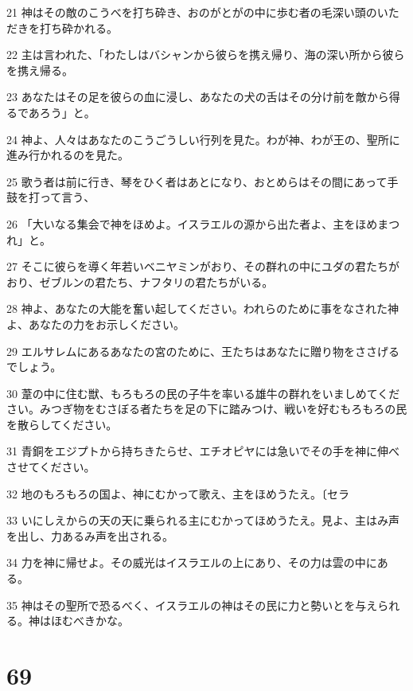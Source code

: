 \par 21 神はその敵のこうべを打ち砕き、おのがとがの中に歩む者の毛深い頭のいただきを打ち砕かれる。
\par 22 主は言われた、「わたしはバシャンから彼らを携え帰り、海の深い所から彼らを携え帰る。
\par 23 あなたはその足を彼らの血に浸し、あなたの犬の舌はその分け前を敵から得るであろう」と。
\par 24 神よ、人々はあなたのこうごうしい行列を見た。わが神、わが王の、聖所に進み行かれるのを見た。
\par 25 歌う者は前に行き、琴をひく者はあとになり、おとめらはその間にあって手鼓を打って言う、
\par 26 「大いなる集会で神をほめよ。イスラエルの源から出た者よ、主をほめまつれ」と。
\par 27 そこに彼らを導く年若いベニヤミンがおり、その群れの中にユダの君たちがおり、ゼブルンの君たち、ナフタリの君たちがいる。
\par 28 神よ、あなたの大能を奮い起してください。われらのために事をなされた神よ、あなたの力をお示しください。
\par 29 エルサレムにあるあなたの宮のために、王たちはあなたに贈り物をささげるでしょう。
\par 30 葦の中に住む獣、もろもろの民の子牛を率いる雄牛の群れをいましめてください。みつぎ物をむさぼる者たちを足の下に踏みつけ、戦いを好むもろもろの民を散らしてください。
\par 31 青銅をエジプトから持ちきたらせ、エチオピヤには急いでその手を神に伸べさせてください。
\par 32 地のもろもろの国よ、神にむかって歌え、主をほめうたえ。〔セラ
\par 33 いにしえからの天の天に乗られる主にむかってほめうたえ。見よ、主はみ声を出し、力あるみ声を出される。
\par 34 力を神に帰せよ。その威光はイスラエルの上にあり、その力は雲の中にある。
\par 35 神はその聖所で恐るべく、イスラエルの神はその民に力と勢いとを与えられる。神はほむべきかな。

\chapter{69}

